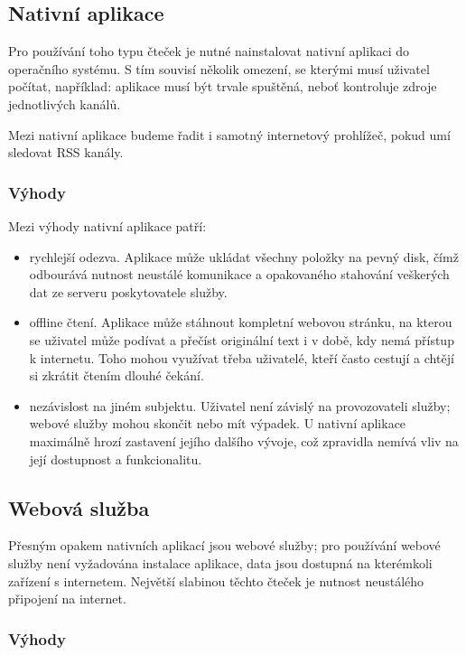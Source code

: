 \subsection{Nativní aplikace}

Pro používání toho typu čteček je nutné nainstalovat nativní aplikaci do operačního systému.
S tím souvisí několik omezení, se kterými musí uživatel počítat, například: aplikace musí být trvale spuštěná, neboť kontroluje zdroje jednotlivých kanálů.


Mezi nativní aplikace budeme řadit i samotný internetový prohlížeč, pokud umí sledovat RSS kanály.

\subsubsection{Výhody}

Mezi výhody nativní aplikace patří:
\begin{itemize}
    \item rychlejší odezva.
        Aplikace může ukládat všechny položky na pevný disk, čímž odbourává nutnost neustálé komunikace a opakovaného stahování veškerých dat ze serveru poskytovatele služby.
    \item offline čtení.
        Aplikace může stáhnout kompletní webovou stránku, na kterou se uživatel může podívat a přečíst originální text i v době, kdy nemá přístup k internetu.
		Toho mohou využívat třeba uživatelé, kteří často cestují a chtějí si zkrátit čtením dlouhé čekání.
    \item nezávislost na jiném subjektu.
        Uživatel není závislý na provozovateli služby; webové služby mohou skončit nebo mít výpadek.
        U nativní aplikace maximálně hrozí zastavení jejího dalšího vývoje, což zpravidla nemívá vliv na její dostupnost a funkcionalitu.
\end{itemize}

\subsection{Webová služba}

Přesným opakem nativních aplikací jsou webové služby; pro používání webové služby není vyžadována instalace aplikace, data jsou dostupná na kterémkoli zařízení s internetem.
Největší slabinou těchto čteček je nutnost neustálého připojení na internet.

\subsubsection{Výhody}

